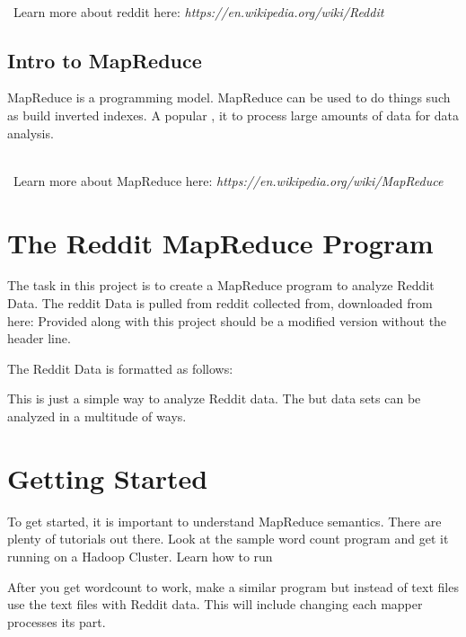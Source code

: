 \documentclass{article}
\begin{document}
\-\\\ \noindent Learn more about reddit here: \textit{https://en.wikipedia.org/wiki/Reddit}

\subsection*{Intro to MapReduce}
MapReduce is a programming model. MapReduce can be used to do things such as build inverted indexes. A popular , it to process large amounts of data for data analysis. 


\-\\\ \noindent Learn more about MapReduce here: \textit{https://en.wikipedia.org/wiki/MapReduce}


\section*{The Reddit MapReduce Program} %
The task in this project is to create a MapReduce program to analyze Reddit Data. The reddit Data is pulled from reddit collected from, downloaded from here: Provided along with this project should be a modified version without the header line. 

The Reddit Data is formatted as follows:




This is just a simple way to analyze Reddit data. The but data sets can be analyzed in a multitude of ways. 



\section*{Getting Started}
To get started, it is important to understand MapReduce semantics. There are plenty of tutorials out there. Look at the sample word count program and get it running on a Hadoop Cluster. Learn how to run

After you get wordcount to work, make a similar program but instead of text files use the text files with Reddit data. This will include changing each mapper processes its part.




\end{document}
